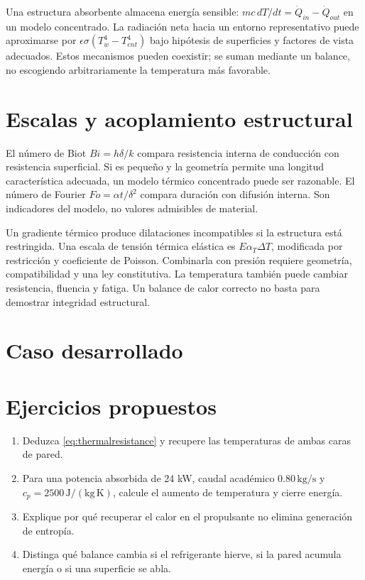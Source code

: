 Una estructura absorbente almacena energía sensible: $mc\,dT/dt=\dot Q_{in}-\dot Q_{out}$ en un modelo concentrado. La radiación neta hacia un entorno representativo puede aproximarse por $\epsilon\sigma(T_w^4-T_{ent}^4)$ bajo hipótesis de superficies y factores de vista adecuados. Estos mecanismos pueden coexistir; se suman mediante un balance, no escogiendo arbitrariamente la temperatura más favorable.\cite{MIT10}
\section{Escalas y acoplamiento estructural}
El número de Biot $Bi=h\delta/k$ compara resistencia interna de conducción con resistencia superficial. Si es pequeño y la geometría permite una longitud característica adecuada, un modelo térmico concentrado puede ser razonable. El número de Fourier $Fo=\alpha t/\delta^2$ compara duración con difusión interna. Son indicadores del modelo, no valores admisibles de material.

Un gradiente térmico produce dilataciones incompatibles si la estructura está restringida. Una escala de tensión térmica elástica es $E\alpha_T\Delta T$, modificada por restricción y coeficiente de Poisson. Combinarla con presión requiere geometría, compatibilidad y una ley constitutiva. La temperatura también puede cambiar resistencia, fluencia y fatiga. Un balance de calor correcto no basta para demostrar integridad estructural.\cite{MIT06}
\section{Caso desarrollado}

\section{Ejercicios propuestos}
\begin{enumerate}
\item Deduzca \eqref{eq:thermalresistance} y recupere las temperaturas de ambas caras de pared.
\item Para una potencia absorbida de 24 kW, caudal académico $0.80\,\mathrm{kg/s}$ y $c_p=2500\,\mathrm{J/(kg\,K)}$, calcule el aumento de temperatura y cierre energía.
\item Explique por qué recuperar el calor en el propulsante no elimina generación de entropía.
\item Distinga qué balance cambia si el refrigerante hierve, si la pared acumula energía o si una superficie se abla.
\end{enumerate}


\studiumchaptercheck
